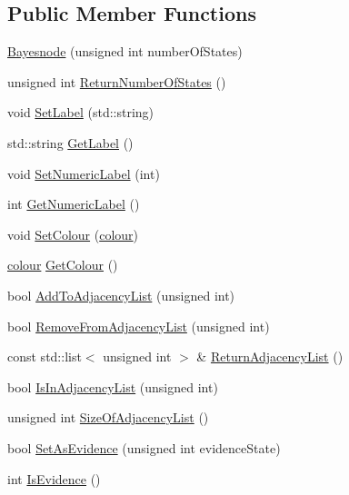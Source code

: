 \subsection*{Public Member Functions}
\begin{DoxyCompactItemize}
\item 
\hyperlink{classbayonet_1_1_bayesnode_a2b676188453fbbb4dc96be714ac931d3}{Bayesnode} (unsigned int number\-Of\-States)
\item 
unsigned int \hyperlink{classbayonet_1_1_bayesnode_a24d38b28413a60938ea7fad7c74e823d}{Return\-Number\-Of\-States} ()
\item 
void \hyperlink{classbayonet_1_1_bayesnode_abaa27f1597d5599344e3a4d82e7b64b0}{Set\-Label} (std\-::string)
\item 
std\-::string \hyperlink{classbayonet_1_1_bayesnode_aebe7f411efe8b8647ed6f7d28f700638}{Get\-Label} ()
\item 
void \hyperlink{classbayonet_1_1_bayesnode_adbda396fa53b6923a69824c98fce9ca1}{Set\-Numeric\-Label} (int)
\item 
int \hyperlink{classbayonet_1_1_bayesnode_a347df4c4cac0f04f6b263a3523ea37d5}{Get\-Numeric\-Label} ()
\item 
void \hyperlink{classbayonet_1_1_bayesnode_a1102ecda4b933a2ccce879ca520a795e}{Set\-Colour} (\hyperlink{classbayonet_1_1_bayesnode_a6294bd0f5387871bc5f39f57cc1f0fb3}{colour})
\item 
\hyperlink{classbayonet_1_1_bayesnode_a6294bd0f5387871bc5f39f57cc1f0fb3}{colour} \hyperlink{classbayonet_1_1_bayesnode_a9f4a34547a9dab484a683450cd68691c}{Get\-Colour} ()
\item 
bool \hyperlink{classbayonet_1_1_bayesnode_ab3c6995309d67dd9b30c645fbb1cb739}{Add\-To\-Adjacency\-List} (unsigned int)
\item 
bool \hyperlink{classbayonet_1_1_bayesnode_a96768ee5d89848d3275c7d916faad480}{Remove\-From\-Adjacency\-List} (unsigned int)
\item 
const std\-::list$<$ unsigned int $>$ \& \hyperlink{classbayonet_1_1_bayesnode_ad20de796507c48523bcf49fffdc7b3d5}{Return\-Adjacency\-List} ()
\item 
bool \hyperlink{classbayonet_1_1_bayesnode_a531f3d3341170ba4ea6d646f1a368b54}{Is\-In\-Adjacency\-List} (unsigned int)
\item 
unsigned int \hyperlink{classbayonet_1_1_bayesnode_a33a92e17091b3d0361d63eeadbbd39b6}{Size\-Of\-Adjacency\-List} ()
\item 
bool \hyperlink{classbayonet_1_1_bayesnode_af84f66934ccb24596b5fbb936903e6e3}{Set\-As\-Evidence} (unsigned int evidence\-State)
\item 
int \hyperlink{classbayonet_1_1_bayesnode_a8410fbbba2974a1a4f8ba4914e76bf33}{Is\-Evidence} ()
\end{DoxyCompactItemize}
